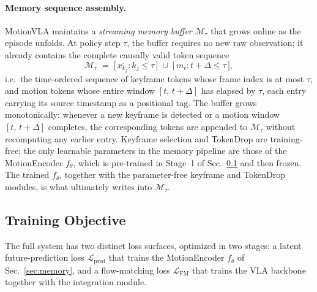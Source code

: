 \documentclass{article}
\begin{document}
\paragraph{Memory sequence assembly.}
MotionVLA maintains a \emph{streaming memory buffer} $\mathcal{M}_\tau$ that
grows online as the episode unfolds.  At policy step $\tau$, the buffer
requires no new raw observation; it already contains the complete
causally valid token sequence
\begin{equation}
  \mathcal{M}_\tau \;=\;
    \bigl[\,x_{k_j}^{\cdot} : k_j \leq \tau\,\bigr]
    \;\cup\;
    \bigl[\,m_t : t + \Delta \leq \tau\,\bigr],
  \label{eq:mem-causal}
\end{equation}
i.e.\ the time-ordered sequence of keyframe tokens whose frame index is at
most $\tau$, and motion tokens whose entire window $[t,\,t\!+\!\Delta]$ has
elapsed by $\tau$, each entry carrying its source timestamp as a positional
tag.  The buffer grows monotonically: whenever a new keyframe is detected or
a motion window $[t,\,t\!+\!\Delta]$ completes, the corresponding tokens are
appended to $\mathcal{M}_\tau$ without recomputing any earlier entry.
Keyframe selection and TokenDrop are training-free; the only learnable
parameters in the memory pipeline are those of the MotionEncoder
$f_\theta$, which is pre-trained in Stage~1 of Sec.~\ref{sec:objective}
and then frozen.  The trained $f_\theta$, together with the
parameter-free keyframe and TokenDrop modules, is what ultimately writes
into $\mathcal{M}_\tau$.

\subsection{Training Objective}
\label{sec:objective}

The full system has two distinct loss surfaces, optimized in two stages:
a latent future-prediction loss $\mathcal{L}_{\mathrm{pred}}$ that trains
the MotionEncoder $f_\theta$ of Sec.~\ref{sec:memory}, and a flow-matching
loss $\mathcal{L}_{\mathrm{FM}}$ that trains the VLA backbone together
with the integration module.
\end{document}
